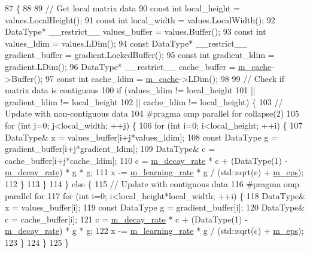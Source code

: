 \begin{DoxyCode}
87                                                                          \{
88 
89   \textcolor{comment}{// Get local matrix data}
90   \textcolor{keyword}{const} \textcolor{keywordtype}{int} local\_height = values.LocalHeight();
91   \textcolor{keyword}{const} \textcolor{keywordtype}{int} local\_width = values.LocalWidth();
92   DataType* \_\_restrict\_\_ values\_buffer = values.Buffer();
93   \textcolor{keyword}{const} \textcolor{keywordtype}{int} values\_ldim = values.LDim();
94   \textcolor{keyword}{const} DataType* \_\_restrict\_\_ gradient\_buffer = gradient.LockedBuffer();
95   \textcolor{keyword}{const} \textcolor{keywordtype}{int} gradient\_ldim = gradient.LDim();
96   DataType* \_\_restrict\_\_ cache\_buffer = \hyperlink{classlbann_1_1rmsprop_a2bbaa35bb209e971a5ac9e1dbb6ece76}{m\_cache}->Buffer();
97   \textcolor{keyword}{const} \textcolor{keywordtype}{int} cache\_ldim = \hyperlink{classlbann_1_1rmsprop_a2bbaa35bb209e971a5ac9e1dbb6ece76}{m\_cache}->LDim();
98 
99   \textcolor{comment}{// Check if matrix data is contiguous}
100   \textcolor{keywordflow}{if} (values\_ldim != local\_height
101       || gradient\_ldim != local\_height
102       || cache\_ldim != local\_height) \{
103     \textcolor{comment}{// Update with non-contiguous data}
104 \textcolor{preprocessor}{    #pragma omp parallel for collapse(2)}
105     \textcolor{keywordflow}{for} (\textcolor{keywordtype}{int} j=0; j<local\_width; ++j) \{
106       \textcolor{keywordflow}{for} (\textcolor{keywordtype}{int} i=0; i<local\_height; ++i) \{
107         DataType& x = values\_buffer[i+j*values\_ldim];
108         \textcolor{keyword}{const} DataType g = gradient\_buffer[i+j*gradient\_ldim];
109         DataType& c = cache\_buffer[i+j*cache\_ldim];
110         c = \hyperlink{classlbann_1_1rmsprop_a9cd712c44e7c4995120e2933b0387d71}{m\_decay\_rate} * c + (DataType(1) - \hyperlink{classlbann_1_1rmsprop_a9cd712c44e7c4995120e2933b0387d71}{m\_decay\_rate}) * g * g;
111         x -= \hyperlink{classlbann_1_1optimizer_ad393dcdcb82b44510c586ed5ec46d4dd}{m\_learning\_rate} * g / (std::sqrt(c) + \hyperlink{classlbann_1_1rmsprop_a6ea73caf5b2769451dfd798665877208}{m\_eps});
112       \}
113     \}
114   \} \textcolor{keywordflow}{else} \{
115     \textcolor{comment}{// Update with contiguous data}
116 \textcolor{preprocessor}{    #pragma omp parallel for}
117     \textcolor{keywordflow}{for} (\textcolor{keywordtype}{int} i=0; i<local\_height*local\_width; ++i) \{
118       DataType& x = values\_buffer[i];
119       \textcolor{keyword}{const} DataType g = gradient\_buffer[i];
120       DataType& c = cache\_buffer[i];
121       c = \hyperlink{classlbann_1_1rmsprop_a9cd712c44e7c4995120e2933b0387d71}{m\_decay\_rate} * c + (DataType(1) - \hyperlink{classlbann_1_1rmsprop_a9cd712c44e7c4995120e2933b0387d71}{m\_decay\_rate}) * g * g;
122       x -= \hyperlink{classlbann_1_1optimizer_ad393dcdcb82b44510c586ed5ec46d4dd}{m\_learning\_rate} * g / (std::sqrt(c) + \hyperlink{classlbann_1_1rmsprop_a6ea73caf5b2769451dfd798665877208}{m\_eps});
123     \}
124   \}
125 \}
\end{DoxyCode}
